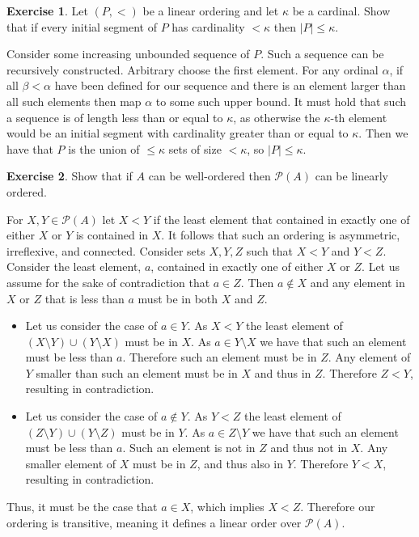 \documentclass{article}
\theoremstyle{definition}
\newtheorem{exer}{Exercise}[section]
\newcommand{\powset}[1]{\mathcal{P}(#1)}
\newcommand{\abs}[1]{\lvert#1\rvert}
\newlength{\defparindent}
\newenvironment{answer}
    {\begin{mdframed}[backgroundcolor=gray!15, linewidth=0pt] \setlength{\parindent}{\defparindent}}
    {\end{mdframed}}
\begin{document}
\begin{exer}
    Let $(P, <)$ be a linear ordering and let $\kappa$ be a cardinal. Show that if every initial segment of $P$ has cardinality $< \kappa$ then $\abs{P} \le \kappa$.
    \begin{answer}
        Consider some increasing unbounded sequence of $P$. Such a sequence can be recursively constructed. Arbitrary choose the first element. For any ordinal $\alpha$, if all $\beta < \alpha$ have been defined for our sequence and there is an element larger than all such elements then map $\alpha$ to some such upper bound. It must hold that such a sequence is of length less than or equal to $\kappa$, as otherwise the $\kappa$-th element would be an initial segment with cardinality greater than or equal to $\kappa$. Then we have that $P$ is the union of $\le \kappa$ sets of size $< \kappa$, so $\abs{P} \le \kappa$. 
    \end{answer}
\end{exer}

\begin{exer}
    Show that if $A$ can be well-ordered then $\powset{A}$ can be linearly ordered.
    \begin{answer}
        For $X, Y \in \powset{A}$ let $X < Y$ if the least element that contained in exactly one of either $X$ or $Y$ is contained in $X$. It follows that such an ordering is asymmetric, irreflexive, and connected. Consider sets $X, Y, Z$ such that $X < Y$ and $Y < Z$. Consider the least element, $a$, contained in exactly one of either $X$ or $Z$. Let us assume for the sake of contradiction that $a \in Z$. Then $a \not\in X$ and any element in $X$ or $Z$ that is less than $a$ must be in both $X$ and $Z$. 
        \begin{itemize}
            \item Let us consider the case of $a \in Y$. As $X < Y$ the least element of $(X \setminus Y) \cup (Y \setminus X)$ must be in $X$. As $a \in Y \setminus X$ we have that such an element must be less than $a$. Therefore such an element must be in $Z$. Any element of $Y$ smaller than such an element must be in $X$ and thus in $Z$. Therefore $Z < Y$, resulting in contradiction.
            \item Let us consider the case of $a \not\in Y$. As $Y < Z$ the least element of $(Z \setminus Y) \cup (Y \setminus Z)$ must be in $Y$. As $a \in Z \setminus Y$ we have that such an element must be less than $a$. Such an element is not in $Z$ and thus not in $X$. Any smaller element of $X$ must be in $Z$, and thus also in $Y$. Therefore $Y < X$, resulting in contradiction.
        \end{itemize}
        Thus, it must be the case that $a \in X$, which implies $X < Z$. Therefore our ordering is transitive, meaning it defines a linear order over $\powset{A}$.
    \end{answer}
\end{exer}
\end{document}
